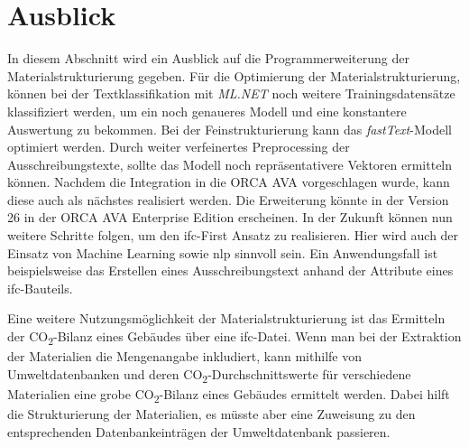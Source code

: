 \section{Ausblick}
\label{c:closing:outlook}
In diesem Abschnitt wird ein Ausblick auf die Programmerweiterung der Materialstrukturierung gegeben. Für die Optimierung der Materialstrukturierung, können bei der Textklassifikation mit \textit{ML.NET} noch weitere Trainingsdatensätze klassifiziert werden, um ein noch genaueres Modell und eine konstantere Auswertung zu bekommen. Bei der Feinstrukturierung kann das \textit{fastText}-Modell optimiert werden. Durch weiter verfeinertes Preprocessing der Ausschreibungstexte, sollte das Modell noch repräsentativere Vektoren ermitteln können. Nachdem die Integration in die ORCA AVA vorgeschlagen wurde, kann diese auch als nächstes realisiert werden. Die Erweiterung könnte in der Version 26 in der ORCA AVA Enterprise Edition erscheinen. In der Zukunft können nun weitere Schritte folgen, um den \ac{ifc}-First Ansatz zu realisieren. Hier wird auch der Einsatz von Machine Learning sowie \ac{nlp} sinnvoll sein. Ein Anwendungsfall ist beispielsweise das Erstellen eines Ausschreibungstext anhand der Attribute eines \ac{ifc}-Bauteils.

Eine weitere Nutzungsmöglichkeit der Materialstrukturierung ist das Ermitteln der CO\textsubscript{2}-Bilanz eines Gebäudes über eine \ac{ifc}-Datei. Wenn man bei der Extraktion der Materialien die Mengenangabe inkludiert, kann mithilfe von Umweltdatenbanken und deren CO\textsubscript{2}-Durchschnittswerte für verschiedene Materialien eine grobe CO\textsubscript{2}-Bilanz eines Gebäudes ermittelt werden. Dabei hilft die Strukturierung der Materialien, es müsste aber eine Zuweisung zu den entsprechenden Datenbankeinträgen der Umweltdatenbank passieren. 
